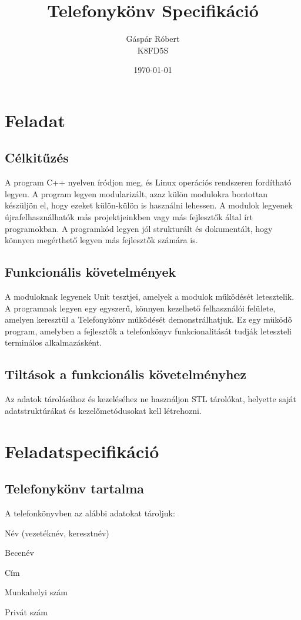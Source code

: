 \documentclass[11pt, letterpaper, openany, oneside]{book}
\title{\textbf{Telefonykönv Specifikáció}}
\author{\LARGE Gáspár Róbert \vspace{4px} \\ K8FD5S}
\date{\today}
\begin{document}
\maketitle

\tableofcontents

\chapter{Feladat}

\section{Célkitűzés}

A program C++ nyelven íródjon meg, és Linux operációs rendszeren fordítható legyen. A program legyen modularizált, azaz külön modulokra bontottan készüljön el, hogy ezeket külön-külön is használni lehessen. A modulok legyenek újrafelhasználhatók más projektjeinkben vagy más fejlesztők által írt programokban. A programkód legyen jól strukturált és dokumentált, hogy könnyen megérthető legyen más fejlesztők számára is.

\section{Funkcionális követelmények}

A moduloknak legyenek Unit tesztjei, amelyek a modulok működését letesztelik. A programnak legyen egy egyszerű, könnyen kezelhető felhasználói felülete, amelyen keresztül a Telefonykönv működését demonstrálhatjuk. Ez egy müködő program, amelyben a fejlesztők a telefonkönyv funkcionalitását tudják leteszteli terminálos alkalmazásként.

\section{Tiltások a funkcionális követelményhez}

Az adatok tárolásához és kezeléséhez ne használjon STL tárolókat, helyette saját adatstruktúrákat és kezelőmetódusokat kell létrehozni.

\chapter{Feladatspecifikáció}

\section{Telefonykönv tartalma}
A telefonkönyvben az alábbi adatokat tároljuk:
\vspace{5px}
\begin{compactitem}
    \item Név (vezetéknév, keresztnév)
    \item Becenév
    \item Cím
    \item Munkahelyi szám
    \item Privát szám
\end{compactitem}
\end{document}
